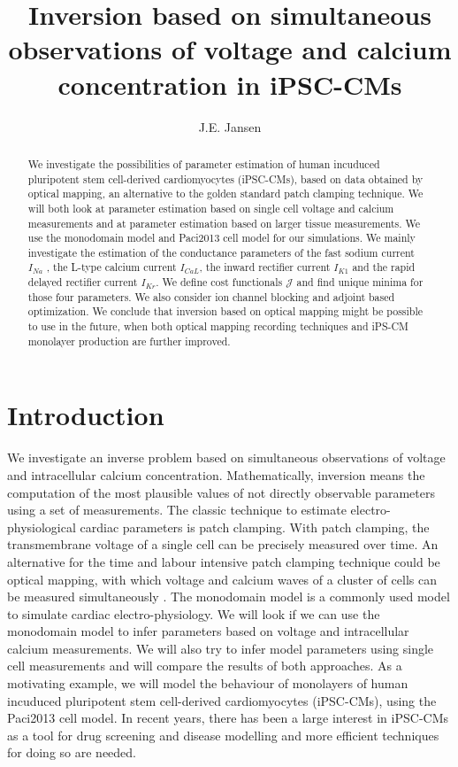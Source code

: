 \documentclass{article}
\title{Inversion based on simultaneous observations of voltage and calcium concentration in iPSC-CMs}
\author{J.E. Jansen %
}
\begin{document}
%
\maketitle
%
\begin{abstract}We investigate the possibilities of parameter estimation of human incuduced pluripotent stem cell-derived cardiomyocytes (iPSC-CMs), based on data obtained by optical mapping, an alternative to the golden standard patch clamping technique. We will both look at parameter estimation based on single cell voltage and calcium measurements and at parameter estimation based on larger tissue measurements. We use the monodomain model and Paci2013 cell model for our simulations. We mainly investigate the estimation of the conductance parameters of the fast sodium current $I_{Na}$ , the L-type calcium current $I_{CaL}$, the inward rectifier current $I_{K1}$ and the rapid delayed rectifier current $I_{Kr}$. We define cost functionals $\mathcal{J}$ and find unique minima for those four parameters. We also consider ion channel blocking and adjoint based optimization. We conclude that inversion based on optical mapping might be possible to use in the future, when both optical mapping recording techniques and iPS-CM monolayer production are further improved.
\end{abstract}
\section{Introduction} \label{Introduction}
We investigate an inverse problem based on simultaneous observations of voltage and intracellular calcium concentration. 
Mathematically, inversion means the computation of the most plausible values of not directly observable parameters using a set of measurements. The classic technique to estimate electro-physiological cardiac parameters is patch clamping. With patch clamping, the transmembrane voltage of a single cell can be precisely measured over time. An alternative for the time and labour intensive patch clamping technique could be optical mapping, with which voltage and calcium waves of a cluster of cells can be measured simultaneously \cite{Lee2012}. The monodomain model is a commonly used model to simulate cardiac electro-physiology. We will look if we can use the monodomain model to infer parameters based on voltage and intracellular calcium measurements. We will also try to infer model parameters using single cell measurements and will compare the results of both approaches. As a motivating example, we will model the behaviour of monolayers of human incuduced pluripotent stem cell-derived cardiomyocytes (iPSC-CMs), using the Paci2013 cell model. In recent years, there has been a large interest in iPSC-CMs as a tool for drug screening and disease modelling and more efficient techniques for doing so are needed.
%
\end{document}
